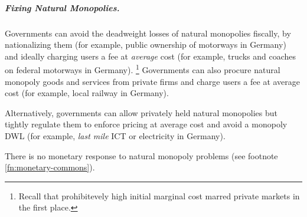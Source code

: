 \subparagraph{Fixing Natural Monopolies.}  \label{sec:natural-monopoly-response}
Governments can avoid the deadweight losses of natural monopolies fiscally, by nationalizing them (for example, public ownership of motorways in Germany) and ideally charging users a fee at \emph{average} cost (for example, trucks and coaches on federal motorways in Germany).
\footnote{
	\label{fn:why-ac-fees}
	Recall that prohibitevely high initial marginal cost marred private markets in the first place.
}
Governments can also procure natural monopoly goods and services from private firms and charge users a fee at average cost (for example, local railway in Germany).


Alternatively, governments can allow privately held natural monopolies but tightly regulate them to enforce pricing at average cost and avoid a monopoly \gls{DWL} (for example, \emph{last mile} \gls{ICT} or electricity in Germany).

There is no monetary response to natural monopoly problems (see footnote \ref{fn:monetary-commons}).




